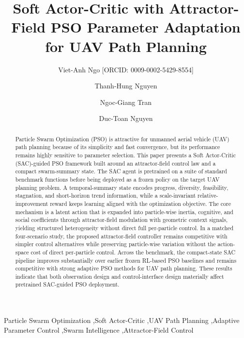 \documentclass[final,5p,times]{elsarticle}
\providecommand{\orcid}[1]{\texorpdfstring{\,\href{https://orcid.org/#1}{\textcolor{ElsevierBlue}{\small[ORCID:\,#1]}}}{ [ORCID: #1]}}
\def\orcid#1{ [ORCID: #1]}%
\def\textcolor#1#2{#2}%
\def\small{}%
\begin{document}
\begin{frontmatter}
\title{Soft Actor-Critic with Attractor-Field PSO Parameter Adaptation for UAV Path Planning}
\author[aff1]{Viet-Anh Ngo\orcid{0009-0002-5429-8554}}
\author[aff1]{Thanh-Hung Nguyen}
\author[aff2]{Ngoc-Giang Tran}
\author[aff1,cor1]{Duc-Toan Nguyen}
\address[aff1]{School of Mechanical Engineering, Hanoi University of Science and Technology, 1A-Dai Co Viet Street, Bach Mai, Hanoi City, Viet Nam}
\address[aff2]{Faculty of Mechanical Engineering, Thainguyen University of Technology, Thainguyen 24000, Vietnam}
\begin{abstract}
Particle Swarm Optimization (PSO) is attractive for unmanned aerial vehicle (UAV) path planning because of its simplicity and fast convergence, but its performance remains highly sensitive to parameter selection.
This paper presents a Soft Actor-Critic (SAC)-guided PSO framework built around an attractor-field control law and a compact swarm-summary state.
The SAC agent is pretrained on a suite of standard benchmark functions before being deployed as a frozen policy on the target UAV planning problem.
A temporal-summary state encodes progress, diversity, feasibility, stagnation, and short-horizon trend information, while a scale-invariant relative-improvement reward keeps learning aligned with the optimization objective.
The core mechanism is a latent action that is expanded into particle-wise inertia, cognitive, and social coefficients through attractor-field modulation with geometric context signals, yielding structured heterogeneity without direct full per-particle control.
In a matched four-scenario study, the proposed attractor-field controller remains competitive with simpler control alternatives while preserving particle-wise variation without the action-space cost of direct per-particle control.
Across the benchmark, the compact-state SAC pipeline improves substantially over earlier frozen RL-based PSO baselines and remains competitive with strong adaptive PSO methods for UAV path planning.
These results indicate that both observation design and control-interface design materially affect pretrained SAC-guided PSO deployment.
\end{abstract}
\begin{keyword}
Particle Swarm Optimization \sep Soft Actor-Critic \sep UAV Path Planning \sep Adaptive Parameter Control \sep Swarm Intelligence \sep Attractor-Field Control
\end{keyword}
\end{frontmatter} 
\end{document}

